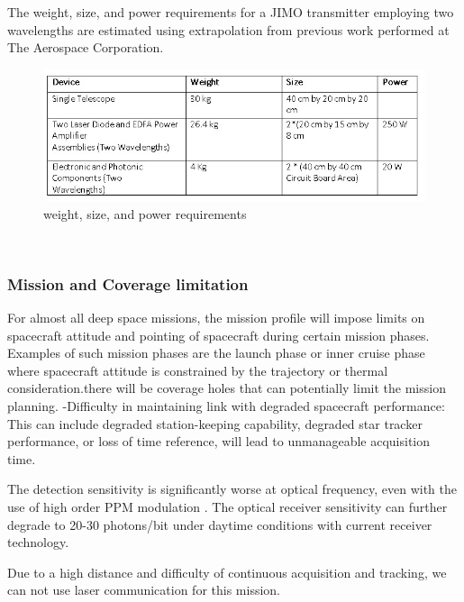 The weight, size, and power requirements for a JIMO transmitter employing two wavelengths are estimated using extrapolation from previous work performed at The Aerospace Corporation.
\begin{figure}[htb]
\begin{center}
\includegraphics[width=1\columnwidth]{figures/laser-communication/bh11.jpg}
\caption{weight, size, and power requirements}
\end{center}
\end{figure}
\\

\subsubsection{Mission and Coverage limitation}

For almost all deep space missions, the mission profile will impose limits on spacecraft attitude and pointing of spacecraft during certain mission phases. Examples of such mission phases are the launch phase or inner cruise phase where spacecraft attitude is constrained by the trajectory or thermal consideration.there will be coverage holes that can potentially limit the mission planning.
-Difficulty in maintaining link with degraded spacecraft performance: This can include degraded station-keeping capability, degraded star tracker performance, or loss of time reference, will lead to unmanageable acquisition time.

The detection sensitivity is significantly worse at optical frequency, even with the use of high order PPM modulation . The optical receiver sensitivity can further degrade to 20-30 photons/bit under daytime conditions with current receiver technology.

Due to a high distance and difficulty of continuous acquisition and tracking, we can not use laser communication for this mission.
